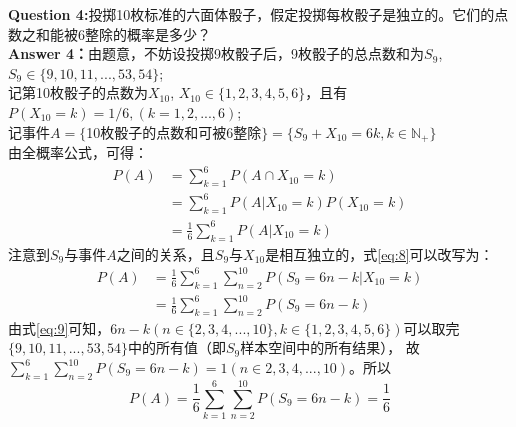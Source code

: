 \documentclass[UTF8]{ctexart}
\begin{document}
\noindent \textbf{Question 4:}\quad 投掷10枚标准的六面体骰子，假定投掷每枚骰子是独立的。它们的点数之和能被6整除的概率是多少？\\
\noindent \textbf{Answer 4：}由题意，不妨设投掷9枚骰子后，9枚骰子的总点数和为$S_{9}$, $S_{9}\in\{9,10,11,...,53,54\}$; \\
记第10枚骰子的点数为$X_{10}$, $X_{10}\in\{1,2,3,4,5,6\}$，且有$P(X_{10}=k)=1/6,(k=1,2,...,6)$; \\
记事件$A=\{$10枚骰子的点数和可被6整除$\}=\{S_{9}+X_{10}=6k,k\in\mathbb{N}_{+}\}$ \\
由全概率公式，可得：
\begin{equation}
    \begin{split}
    P(A) &= \sum\limits_{k = 1}^{6}P(A \cap X_{10}=k) \\
    &=  \sum\limits_{k = 1}^{6}P(A|X_{10}=k)P(X_{10}=k)\\
    &= \frac{1}{6}\sum\limits_{k = 1}^{6}P(A|X_{10}=k)
    \end{split}
    \label{eq:8}
\end{equation}
注意到$S_{9}$与事件$A$之间的关系，且$S_{9}$与$X_{10}$是相互独立的，式\ref{eq:8}可以改写为：
\begin{equation}
    \begin{split}
    P(A) &= \frac{1}{6}\sum\limits_{k = 1}^{6}\sum\limits_{n = 2}^{10}P(S_{9}=6n-k|X_{10}=k) \\
    &= \frac{1}{6}\sum\limits_{k = 1}^{6}\sum\limits_{n = 2}^{10}P(S_{9}=6n-k) 
    \end{split}
    \label{eq:9}
\end{equation}
由式\ref{eq:9}可知，$6n-k(n\in \{2,3,4,...,10\},k\in \{1,2,3,4,5,6\})$可以取完$\{9,10,11,...,53,54\}$中的所有值（即$S_{9}$样本空间中的所有结果），
故$\sum\limits_{k = 1}^{6}\sum\limits_{n = 2}^{10}P(S_{9}=6n-k)=1(n\in {2,3,4,...,10})$。所以
\begin{equation}
    P(A) = \frac{1}{6}\sum\limits_{k = 1}^{6}\sum\limits_{n = 2}^{10}P(S_{9}=6n-k) = \frac{1}{6}
    \label{eq:10} 
\end{equation}
\end{document}
